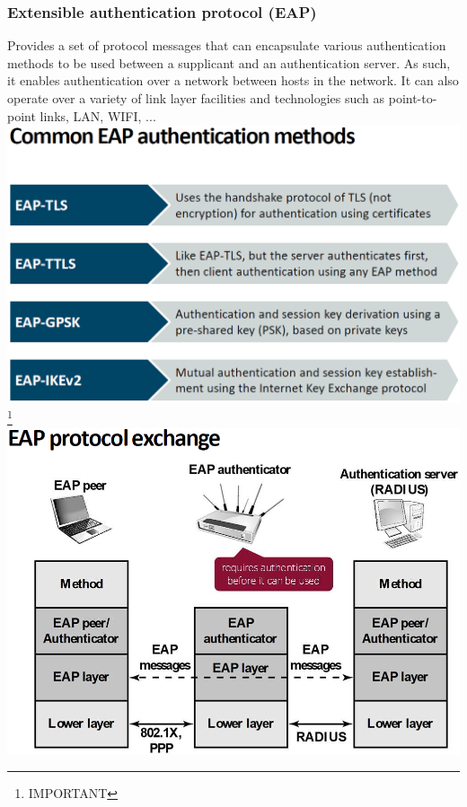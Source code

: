 \documentclass[12pt]{article}
\begin{document}
 \subsubsection{Extensible authentication protocol (EAP)}
 Provides a set of protocol messages that can encapsulate various authentication methods to be used between a supplicant and an authentication server. As such, it enables authentication over a network between hosts in the network. It can also operate over a variety of link layer facilities and technologies such as point-to-point links, LAN, WIFI, ...\\
 \includegraphics[width=\linewidth]{./slides/L6P2EAPAUTH.PNG}\footnote{IMPORTANT}\\  \includegraphics[width=0.8\linewidth]{./slides/L6P2EAPEXCH.PNG}
 
\end{document}
